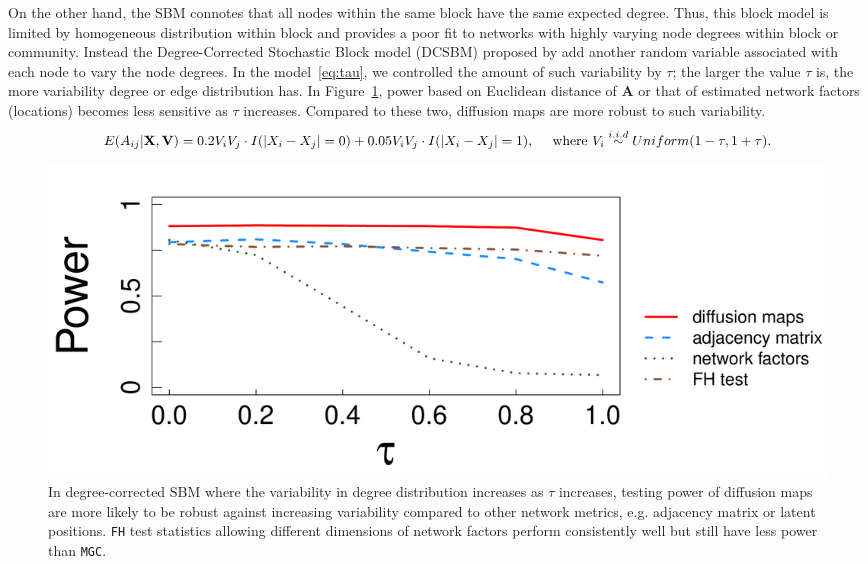 \documentclass[11pt]{article}
\theoremstyle{definition}
\begin{document}
On the other hand, the SBM connotes that all nodes within the same block have the same expected degree. Thus, this block model is limited by homogeneous distribution within block and provides a poor fit to networks with highly varying node degrees within block or community. Instead the Degree-Corrected Stochastic Block model (DCSBM) proposed by \cite{karrer2011stochastic} add another random variable associated with each node to vary the node degrees. In the model~\ref{eq:tau}, we controlled the amount of such variability by $\tau$; the larger the value $\tau$ is, the more variability degree or edge distribution has. In Figure~\ref{fig:dcSBM}, power based on Euclidean distance of $\mathbf{A}$ or that of estimated network factors (locations) becomes less sensitive as $\tau$ increases. Compared to these two, diffusion maps are more robust to such variability. 
\vspace*{-0.4cm}
\begin{equation}
E( A_{ij} | \mathbf{X}, \mathbf{V} )  = 0.2 V_{i} V_{j} \cdot I ( |X_{i} - X_{j}| = 0 ) + 0.05 V_{i} V_{j} \cdot I(|X_{i} - X_{j}| = 1), \quad \mbox{ where } V_{i} \overset{i.i.d}{\sim} Uniform(1 - \tau, 1 + \tau). 
\label{eq:tau}
\vspace*{-0.4cm}
\end{equation} 
\begin{figure}[h]
	\centering
	\includegraphics[width=0.7\linewidth]{../Figure/tau_simple.pdf}
	\caption{In degree-corrected SBM where the variability in degree distribution increases as $\tau$ increases, testing power of diffusion maps are more likely to be robust against increasing variability compared to other network metrics, e.g. adjacency matrix or latent positions. \texttt{FH} test statistics allowing different dimensions of network factors perform consistently well but still have less power than \texttt{MGC}.}
	\label{fig:dcSBM}
	\vspace*{-0.5cm}
\end{figure}	
\end{document}
